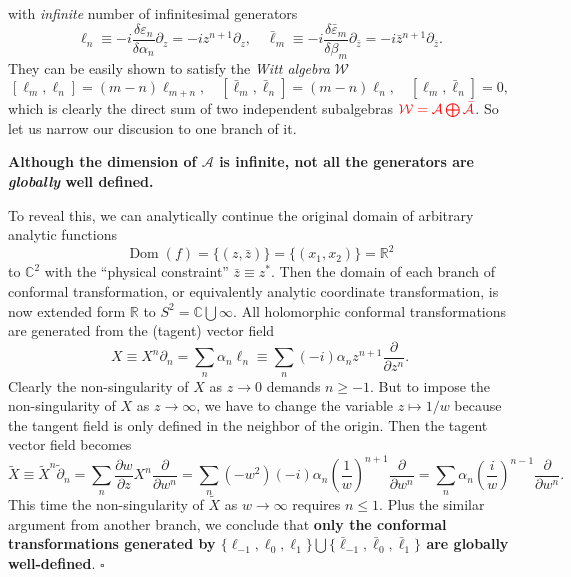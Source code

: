 \documentclass[10pt,nofootinbib]{revtex4}
\newcounter{Claim}[section]
\newenvironment{Claim}[1][]{{\par\normalfont\bfseries \underline{Claim~\stepcounter{Claim}\arabic{Claim}.}~#1~~}}{\par}
\newenvironment{Proof}{{\par~{\normalfont\bfseries $\vartriangleright$}~~}}{\hfill $\square$\par\hfill\par} %
\begin{document}
		with \emph{infinite} number of infinitesimal generators
		\begin{equation}\label{2.1.2}
			\ell_n\equiv-i\dfrac{\delta \varepsilon_n}{\delta \alpha_n}\partial_z=-iz^{n+1}\partial_z,\quad\bar\ell_m\equiv-i\dfrac{\delta\bar\varepsilon_m}{\delta \beta_m}\partial_{\bar z}=-i\bar z^{n+1}\partial_{\bar z}.
		\end{equation}
		They can be easily shown to satisfy the \emph{Witt algebra} $\mathcal{W}$
		\begin{equation}\label{2.1.3}
			[\ell_m,\ell_n]=(m-n)\ell_{m+n},\quad[\bar\ell_m,\bar\ell_n]=(m-n)\ell_n,\quad[\ell_m,\bar\ell_n]=0,
		\end{equation}
		which is clearly the direct sum of two independent subalgebras ${\color{red}\mathcal{W}=\mathcal{A}\bigoplus\bar{\mathcal{A}}}$. So let us narrow our discusion to one branch of it.\par
		\begin{Claim}
			\textbf{{\color{red} Although the dimension of $\mathcal{A}$ is infinite, not all the generators are \emph{globally} well defined.}}
		\end{Claim}
		\begin{Proof}
			To reveal this, we can analytically continue the original domain of arbitrary analytic functions
			\begin{equation*}
				\mathop{\mathrm{Dom}}(f)=\{(z,\bar z)\}=\{(x_1,x_2)\}=\mathbb{R}^2
			\end{equation*}
			to $\mathbb{C}^2$ with the ``physical constraint'' $\bar z\equiv z^*$. Then the domain of each branch of conformal transformation, or equivalently analytic coordinate transformation, is now extended form $\mathbb{R}$ to $S^2=\mathbb{C}\bigcup\infty$. All holomorphic conformal transformations are generated from the (tagent) vector field
			\begin{equation*}
				X\equiv X^n \partial_n=\sum_n \alpha_n\ell_n\equiv\sum_n(-i)\alpha_n z^{n+1}\dfrac{\partial }{\partial z^n}.
			\end{equation*}
			Clearly the non-singularity of $X$ as $z\rightarrow0$ demands $n\geq-1$. But to impose the non-singularity of $X$ as $z\rightarrow\infty$, we have to change the variable $z\mapsto1/w$ because the tangent field is only defined in the neighbor of the origin. Then the tagent vector field becomes
			\begin{equation*}
				\widetilde{X}\equiv\widetilde{X}^n\widetilde{\partial}_n=\sum_n\dfrac{\partial w}{\partial z} X^n\dfrac{\partial }{\partial w^n}=\sum_n(-w^2)(-i)\alpha_n\left(\dfrac{1}{w}\right)^{n+1}\dfrac{\partial }{\partial w^n}=\sum_n \alpha_n\left(\dfrac{i}{w}\right)^{n-1}\dfrac{\partial }{\partial w^n}.
			\end{equation*}
			This time the non-singularity of $\widetilde{X}$ as $w\rightarrow\infty$ requires $n\leq1$. Plus the similar argument from another branch, we conclude that \textbf{\color{red}only the conformal transformations generated by $\{\ell_{-1},\ell_0,\ell_1\}\bigcup\{\bar\ell_{-1},\bar\ell_0,\bar\ell_1\}$ are globally well-defined}. 
		\end{Proof}
	
\end{document}
